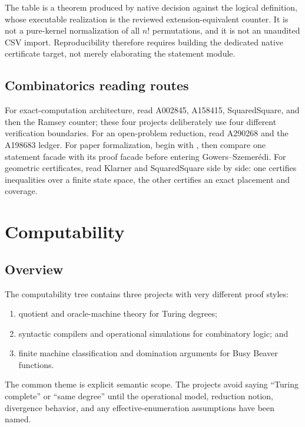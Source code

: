 \documentclass[
  10pt,
  a4paper,
  twoside,
  open=any,
  parskip=half,
  headings=big
]{scrreprt}
\newcommand{\code}[1]{\texttt{\detokenize{#1}}}
\begin{document}
\begin{boundarybox}
The table is a theorem produced by native decision against the logical \code{reflectedM} definition, whose executable realization is the reviewed extension-equivalent counter. It is not a pure-kernel normalization of all $n!$ permutations, and it is not an unaudited CSV import. Reproducibility therefore requires building the dedicated native certificate target, not merely elaborating the statement module.
\end{boundarybox}

\section{Combinatorics reading routes}

For exact-computation architecture, read A002845, A158415, SquaredSquare, and then the Ramsey counter; these four projects deliberately use four different verification boundaries. For an open-problem reduction, read A290268 and the A198683 ledger. For paper formalization, begin with \code{RamseyPaperCommon}, then compare one statement facade with its proof facade before entering Gowers--Szemer\'edi. For geometric certificates, read Klarner and SquaredSquare side by side: one certifies inequalities over a finite state space, the other certifies an exact placement and coverage.

\chapter{Computability}
\label{ch:computability}

\section{Overview}

The computability tree contains three projects with very different proof styles:

\begin{enumerate}
  \item quotient and oracle-machine theory for Turing degrees;
  \item syntactic compilers and operational simulations for combinatory logic; and
  \item finite machine classification and domination arguments for Busy Beaver functions.
\end{enumerate}

The common theme is explicit semantic scope. The projects avoid saying ``Turing complete'' or ``same degree'' until the operational model, reduction notion, divergence behavior, and any effective-enumeration assumptions have been named.
\end{document}
